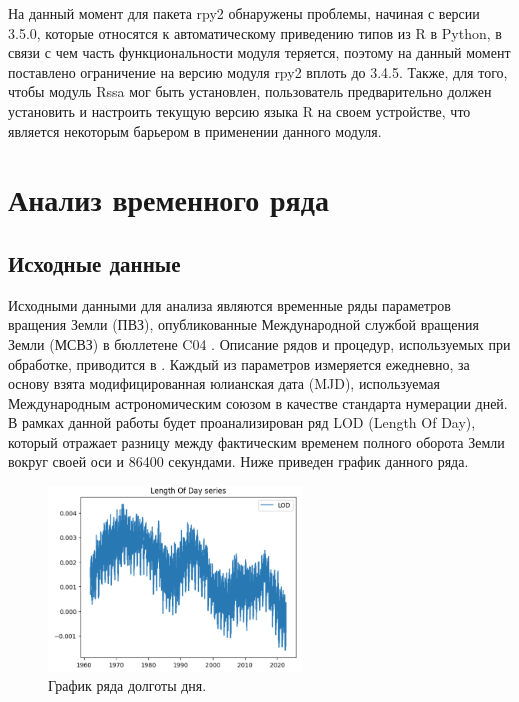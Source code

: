 \documentclass[specialist,
			   substylefile = spbu_report.rtx,
			   subf,href,colorlinks=true, 12pt]{disser}
\begin{document}
На данный момент для пакета rpy2 обнаружены проблемы, начиная с версии 3.5.0, которые относятся к автоматическому приведению типов из R в Python, в связи с чем часть функциональности модуля теряется, поэтому на данный момент поставлено ограничение на версию модуля rpy2 вплоть до 3.4.5. Также, для того, чтобы модуль Rssa мог быть установлен, пользователь предварительно должен установить и настроить текущую версию языка R на своем устройстве, что является некоторым барьером в применении данного модуля.

\chapter{Анализ временного ряда}

\section{Исходные данные}

Исходными данными для анализа являются временные ряды параметров вращения Земли (ПВЗ), опубликованные Международной службой вращения Земли (МСВЗ) в бюллетене C04 \cite{eop-c04}. Описание рядов и процедур, используемых при обработке, приводится в \cite{eop-с04-guide}. Каждый из параметров измеряется ежедневно, за основу взята модифицированная юлианская дата (MJD), используемая Международным астрономическим союзом в качестве стандарта нумерации дней.\\

В рамках данной работы будет проанализирован ряд LOD (Length Of Day), который отражает разницу между фактическим временем полного оборота Земли вокруг своей оси и 86400 секундами. Ниже приведен график данного ряда.

\begin{figure}[H]
	\centering
	\includegraphics[width=0.6\textwidth]{py_lod_plot}
	\caption{График ряда долготы дня.}
	\label{fig:py_lod_plot}
\end{figure}
\end{document}
